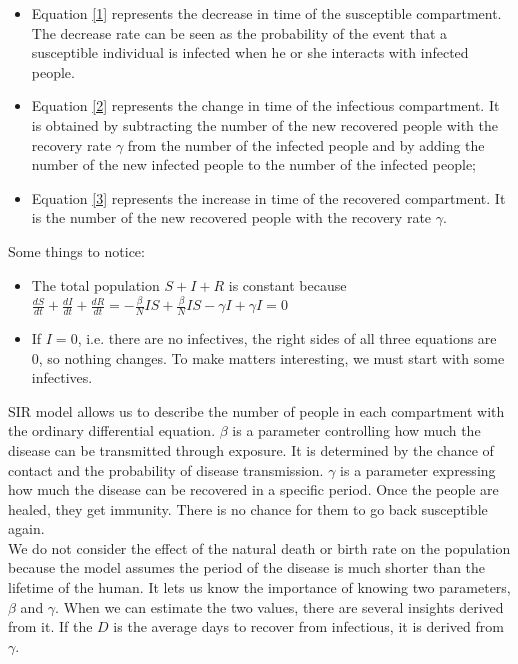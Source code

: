 \documentclass[a4paper]{article}
\begin{document}
    \begin{itemize}
        \item Equation \eqref{1} represents the decrease in time of the susceptible compartment. The decrease rate can be seen as the probability of the event that a susceptible individual is infected when he or she interacts with infected people.
        \item Equation \eqref{2} represents the change in time of the infectious compartment. It is obtained by subtracting the number of the new recovered people with the recovery rate $\gamma$ from the number of the infected people and by adding the number of the new infected people to the number of the infected people;
        \item Equation \eqref{3} represents the increase in time of the recovered compartment. It is the number of the new recovered people with the recovery rate $\gamma$.
    \end{itemize}
    Some things to notice: 
    \begin{itemize}
        \item The total population $S + I + R$ is constant because \\
        $\frac{dS}{dt} + \frac{dI}{dt} + \frac{dR}{dt} = - \frac{\beta}{N}IS + \frac{\beta}{N}IS - \gamma I + \gamma I = 0$ 
        \item If $I =0$, i.e. there are no infectives, the right sides of all three equations are 0, so nothing changes. To make matters interesting, we must start with some infectives.
    \end{itemize}
        
        SIR model allows us to describe the number of people in each compartment with the ordinary differential equation. $\beta$  is a parameter controlling how much the disease can be transmitted through exposure. It is determined by the chance of contact and the probability of disease transmission. $\gamma$  is a parameter expressing how much the disease can be recovered in a specific period. Once the people are healed, they get immunity. There is no chance for them to go back susceptible again. \\
        We do not consider the effect of the natural death or birth rate on the population because the model assumes the period of the disease is much shorter than the lifetime of the human. It lets us know the importance of knowing two parameters, $\beta$ and $\gamma$. When we can estimate the two values, there are several insights derived from it. If the $D$ is the average days to recover from infectious, it is derived from $\gamma$.
        
\end{document}
